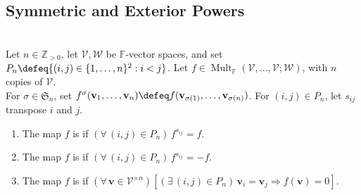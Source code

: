 \subsection{Symmetric and Exterior Powers}


\begin{definition} \label{def:special-multilinear-maps} \\
Let $n\in\mathbb{Z}_{>0}$, let $\mathcal{V},\mathcal{W}$ be $\mathbb{F}$-vector spaces, and set $P_n\defeq\{(i,j)\in\{1,\ldots,n\}^2:i<j\}$. Let $f\in\operatorname{Mult}_{\mathbb{F}}(\mathcal{V},\ldots,\mathcal{V};\mathcal{W})$, with $n$ copies of $\mathcal{V}$.\\
For $\sigma\in\mathfrak{S}_n$, set $f^\sigma(\mathbf{v}_1,\ldots,\mathbf{v}_n)\defeq f(\mathbf{v}_{\sigma(1)},\ldots,\mathbf{v}_{\sigma(n)})$. For $(i,j)\in P_n$, let $s_{ij}$ transpose $i$ and $j$.
\begin{enumerate}[label=(\roman*)]
\setlength{\itemsep}{0pt}
\item The map $f$ is  if $(\forall\,(i,j)\in P_n)\,f^{s_{ij}}=f$.
\item The map $f$ is  if $(\forall\,(i,j)\in P_n)\,f^{s_{ij}}=-f$.
\item The map $f$ is  if $(\forall\,\mathbf{v}\in\mathcal{V}^{\times n})[(\exists\,(i,j)\in P_n)\,\mathbf{v}_i=\mathbf{v}_j\Rightarrow f(\mathbf{v})=0]$.
\end{enumerate}
\end{definition}


